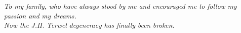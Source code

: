 \begin{dedication}
\textit{To my family, who have always stood by me and encouraged me to follow my passion and my dreams.\\Now the J.H. Terwel degeneracy has finally been broken.}
\end{dedication}
